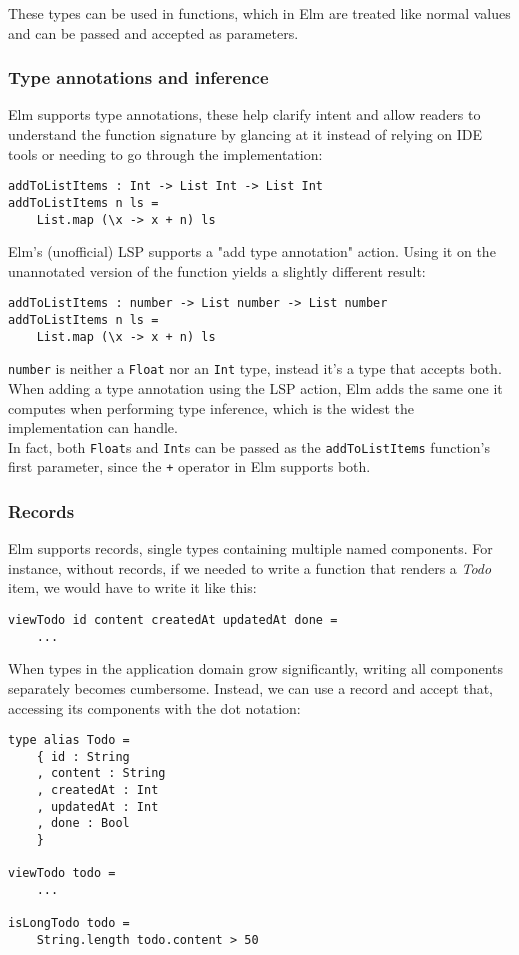 These types can be used in functions, which in Elm are treated like normal values and can be passed and accepted as parameters.

\subsubsection{Type annotations and inference}
Elm supports type annotations, these help clarify intent and allow readers to understand the function signature by glancing at it instead of relying on IDE tools or needing to go through the implementation:
\begin{verbatim}
addToListItems : Int -> List Int -> List Int
addToListItems n ls =
    List.map (\x -> x + n) ls
\end{verbatim}

Elm's (unofficial) LSP supports a "add type annotation" action. Using it on the unannotated version of the function yields a slightly different result:
\begin{verbatim}
addToListItems : number -> List number -> List number
addToListItems n ls =
    List.map (\x -> x + n) ls
\end{verbatim}
\texttt{number} is neither a \texttt{Float} nor an \texttt{Int} type, instead it's a type that accepts both. When adding a type annotation using the LSP action, Elm adds the same one it computes when performing type inference, which is the widest the implementation can handle.\\
In fact, both \texttt{Float}s and \texttt{Int}s can be passed as the \texttt{addToListItems} function's first parameter, since the \texttt{+} operator in Elm supports both.

\subsubsection{Records}
Elm supports records, single types containing multiple named components. For instance, without records, if we needed to write a function that renders a \textit{Todo} item, we would have to write it like this:
\begin{verbatim}
viewTodo id content createdAt updatedAt done =
    ...
\end{verbatim}
When types in the application domain grow significantly, writing all components separately becomes cumbersome. Instead, we can use a record and accept that, accessing its components with the dot notation:
\begin{verbatim}
type alias Todo =
    { id : String
    , content : String
    , createdAt : Int
    , updatedAt : Int
    , done : Bool
    }

viewTodo todo =
    ...

isLongTodo todo =
    String.length todo.content > 50
\end{verbatim}

